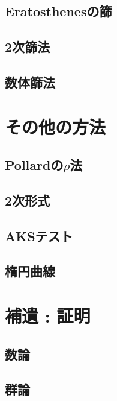 \subsection{Eratosthenesの篩}

\subsection{2次篩法}

\subsection{数体篩法}


\section{その他の方法}
\subsection{Pollardの$\rho$法}

\subsection{2次形式}

\subsection{AKSテスト}

\subsection{楕円曲線}


\section{補遺 : 証明}
\subsection{数論}

\subsection{群論}


\newpage
\printindex



